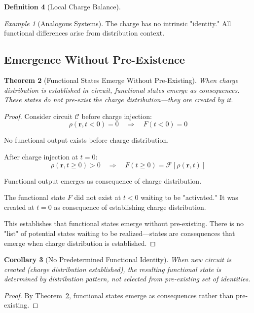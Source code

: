 \documentclass[12pt,a4paper]{article}
\theoremstyle{plain}
\newtheorem{theorem}{Theorem}[section]
\newtheorem{corollary}[theorem]{Corollary}
\theoremstyle{definition}
\newtheorem{definition}[theorem]{Definition}
\theoremstyle{remark}
\newtheorem{example}[theorem]{Example}
\begin{document}
\begin{definition}[Local Charge Balance]
\begin{example}[Analogous Systems]
The charge has no intrinsic "identity." All functional differences arise from distribution context.
\end{example}

\subsection{Emergence Without Pre-Existence}

\begin{theorem}[Functional States Emerge Without Pre-Existing]
\label{thm:emergence_no_preexistence}
When charge distribution is established in circuit, functional states emerge as consequences. These states do not pre-exist the charge distribution—they are created by it.
\end{theorem}

\begin{proof}
Consider circuit $\mathcal{C}$ before charge injection:
\begin{equation}
\rho(\mathbf{r}, t < 0) = 0 \quad \Rightarrow \quad F(t < 0) = 0
\end{equation}

No functional output exists before charge distribution.

After charge injection at $t = 0$:
\begin{equation}
\rho(\mathbf{r}, t \geq 0) > 0 \quad \Rightarrow \quad F(t \geq 0) = \mathcal{F}[\rho(\mathbf{r},t)]
\end{equation}

Functional output emerges as consequence of charge distribution.

The functional state $F$ did not exist at $t < 0$ waiting to be "activated." It was created at $t = 0$ as consequence of establishing charge distribution.

This establishes that functional states emerge without pre-existing. There is no "list" of potential states waiting to be realized—states are consequences that emerge when charge distribution is established.
\end{proof}

\begin{corollary}[No Predetermined Functional Identity]
\label{cor:no_predetermined}
When new circuit is created (charge distribution established), the resulting functional state is determined by distribution pattern, not selected from pre-existing set of identities.
\end{corollary}

\begin{proof}
By Theorem~\ref{thm:emergence_no_preexistence}, functional states emerge as consequences rather than pre-existing.


\end{proof}
\end{definition}
\end{document}
